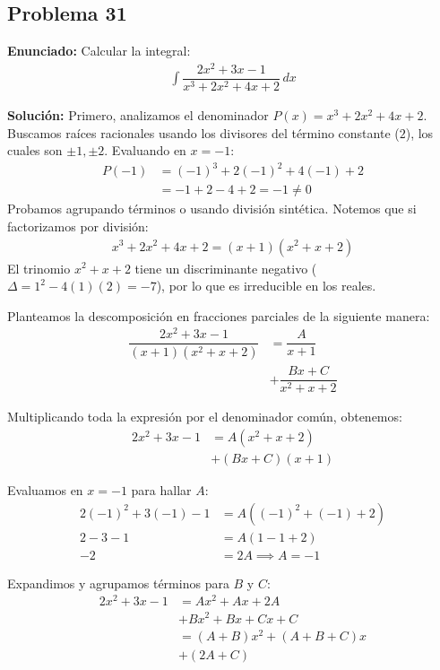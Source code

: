 \subsection*{Problema 31}
\textbf{Enunciado:} Calcular la integral:
\begin{align*}
\int \dfrac{2x^2 + 3x - 1}{x^3 + 2x^2 + 4x + 2} \, dx
\end{align*}

\textbf{Solución:}
Primero, analizamos el denominador 
$P(x) = x^3 + 2x^2 + 4x + 2$. 
Buscamos raíces racionales usando los divisores del término constante ($2$), los cuales son $\pm 1, \pm 2$. Evaluando en $x = -1$:
\begin{align*}
P(-1) &= (-1)^3 + 2(-1)^2 + 4(-1) + 2 \\
&= -1 + 2 - 4 + 2 = -1 \neq 0
\end{align*}
Probamos agrupando términos o usando división sintética. Notemos que si factorizamos por división:
\begin{align*}
x^3 + 2x^2 + 4x + 2 = (x+1)(x^2 + x + 2)
\end{align*}
El trinomio $x^2 + x + 2$ tiene un discriminante negativo ($\Delta = 1^2 - 4(1)(2) = -7$), por lo que es irreducible en los reales.

Planteamos la descomposición en fracciones parciales de la siguiente manera:
\begin{align*}
\dfrac{2x^2 + 3x - 1}{(x+1)(x^2 + x + 2)} &= \dfrac{A}{x+1} \\
&+ \dfrac{Bx + C}{x^2 + x + 2}
\end{align*}

Multiplicando toda la expresión por el denominador común, obtenemos:
\begin{align*}
2x^2 + 3x - 1 &= A(x^2 + x + 2) \\
&+ (Bx + C)(x+1)
\end{align*}

Evaluamos en $x = -1$ para hallar $A$:
\begin{align*}
2(-1)^2 + 3(-1) - 1 &= A((-1)^2 + (-1) + 2) \\
2 - 3 - 1 &= A(1 - 1 + 2) \\
-2 &= 2A \implies A = -1
\end{align*}

Expandimos y agrupamos términos para $B$ y $C$:
\begin{align*}
2x^2 + 3x - 1 &= Ax^2 + Ax + 2A \\
&+ Bx^2 + Bx + Cx + C \\
&= (A+B)x^2 + (A+B+C)x \\
&+ (2A+C)
\end{align*}

